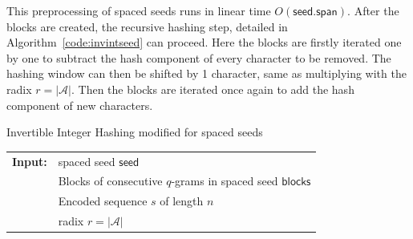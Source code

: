 \documentclass[twoside,a4paper,bsc]{master}
\newcommand{\Qgram}[1]{\(#1\)-gram}
\newcommand{\Seed}[0]{\mathsf{seed}}
\newcommand{\Span}[0]{\mathsf{span}}
\newcommand{\Blocks}[0]{\mathsf{blocks}}
\newcommand{\Block}[0]{\mathsf{block}}
\newcommand{\PosToAdd}[0]{\mathsf{PosToAdd}}
\newcommand{\PosToRmv}[0]{\mathsf{PosToRmv}}
\newcommand{\WeightToAdd}[0]{\mathsf{WeightToAdd}}
\newcommand{\WeightToRmv}[0]{\mathsf{WeightToRmv}}
\newcommand{\Append}[0]{\mathsf{append}}
\newcommand{\HashValue}[0]{\mathsf{HashValue}}
\newcommand{\HashValVec}[0]{\mathsf{HashValVec}}
\newcommand{\Alpha}[0]{\mathcal{A}}
\begin{document}
This preprocessing of spaced seeds runs in linear time \(O(\Seed.\Span)\).
After the blocks are created, the recursive hashing step, detailed in
Algorithm~\ref{code:invintseed} can proceed. Here the blocks are firstly
iterated one
by one to subtract the hash component of every character to be removed. The
hashing window can then be shifted by 1 character, same as multiplying with
the radix \(r = |\Alpha|\). Then the blocks are iterated once again to add 
the hash component of new characters.
\begin{algorithm}[t]
\caption{Invertible Integer Hashing modified for spaced seeds}
\label{code:invintseed}
\begin{tabular}{@{}l@{~}l}
\textbf{Input:}
&spaced seed \(\Seed\)\\
&Blocks of consecutive \Qgram{q}s in spaced seed \(\Blocks\)\\
&Encoded sequence \(s\) of length \(n\)\\
&radix \(r = |\Alpha|\)
\end{tabular}
\begin{algorithmic}
\State \(\HashValVec\gets []\)
\State \(\HashValue \gets 0\)
\For{\(i \in [0,\Seed.\Span)\)}
\If{\(\Seed[i]\)}
\State \(\HashValue \text{ \(\cdot\)= } r\)
\State \(\HashValue \text{ += } s[i]\)
\EndIf
\EndFor
\State \(\HashValVec .\Append(\HashValue)\)
\For{\(j\) \textbf{from} 1 to $n-\Seed.\Span$}\Comment{Compute other hash
values}
\For{\(\Block \in \Blocks\)}
\State \(\HashValue \text{ -= } \Block.\WeightToRmv \cdot s[\Block.\PosToRmv
+ j]\)
\label{code:lookup1}
\EndFor
\State \(\HashValue \text{ \(\cdot\)= } r\)\label{code:extraMultiplication}
\For{\(\Block \in \Blocks\)}
\State \(\HashValue \text{ += } \Block.\WeightToAdd \cdot s[\Block.\PosToAdd
+ j]\)
\label{code:lookup2}
\EndFor
\State \(\HashValVec.\Append(\HashValue)\)
\EndFor
\State return \(\HashValVec\)
\end{algorithmic}
\end{algorithm}
\end{document}
